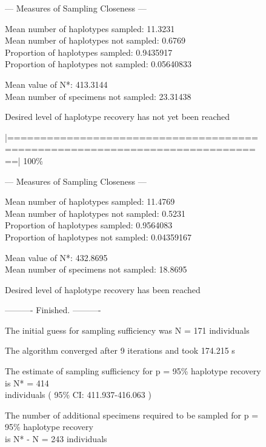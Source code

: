 \begin{figure}[H]
{\noindent --- Measures of Sampling Closeness ---

\vspace{2mm} 
 
\noindent Mean number of haplotypes sampled: 11.3231  \\
Mean number of haplotypes not sampled: 0.6769  \\
Proportion of haplotypes sampled: 0.9435917  \\
Proportion of haplotypes not sampled: 0.05640833      

\vspace{2mm} 
 
\noindent Mean value of N*: 413.3144 \\
Mean number of specimens not sampled: 23.31438

\vspace{3mm}
 
\noindent Desired level of haplotype recovery has not yet been reached

\vspace{2mm}

\noindent |==============================================================================| 100\%

\vspace{3mm}

\noindent --- Measures of Sampling Closeness ---

\vspace{2mm} 
 
\noindent Mean number of haplotypes sampled: 11.4769  \\
Mean number of haplotypes not sampled: 0.5231  \\
Proportion of haplotypes sampled: 0.9564083 \\
Proportion of haplotypes not sampled: 0.04359167    

\vspace{2mm} 
 
\noindent Mean value of N*: 432.8695 \\
Mean number of specimens not sampled: 18.8695 

\vspace{3mm}
 
\noindent Desired level of haplotype recovery has been reached

\vspace{2mm}

\noindent ---------- Finished. ----------
        
\noindent The initial guess for sampling sufficiency was N = 171 individuals
 
\noindent The algorithm converged after 9 iterations and took 174.215 s 
 
\noindent The estimate of sampling sufficiency for p = 95\% haplotype recovery is N* = 414 \\ individuals ( 95\% CI: 411.937-416.063 )

\noindent The number of additional specimens required to be sampled for p = 95\% haplotype recovery \\ is N* - N = 243 individuals

}

\end{figure}

